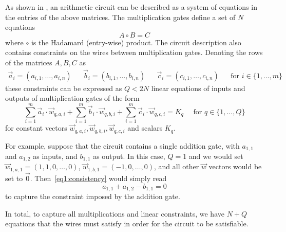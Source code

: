 As shown in \cite{BootleCCGP16}, an arithmetic circuit can be described as a system of equations in the entries of the above matrices. The multiplication gates define a set of $N$ equations 
\begin{equation}\label{eq1:product}
A \circ B = C
\end{equation}
where $\circ$ is the Hadamard (entry-wise) product. 
%
The circuit description also contains constraints on the wires between multiplication gates. %
Denoting the rows of the matrices $A,B,C$ as
\begin{align*}\vec{a}_ {i}=(a_{i,1},\ldots,a_{i,n})&& \vec{b}_ {i}=(b_{i,1},\ldots,b_{i,n})&&\vec{c}_ {i}=(c_{i,1},\ldots,c_{i,n})&& \text{for }  i \in \{1,\ldots,m\}\end{align*}
these constraints can be expressed as $Q<2N$ linear equations of inputs and outputs of multiplication gates of the form
\begin{equation}\label{eq1:consistency}
\sum_{i=1}^m \vec{a}_{i} \cdot \vec{w}_{q,{a,i}}+\sum_{i=1}^m \vec{b}_{i} \cdot \vec{w}_{q,{b,i}}+\sum_{i=1}^m \vec{c}_{i} \cdot  \vec{w}_{q,{c,i}}=K_{q} \quad \text{ for } q \in\{1,\ldots,Q\}
\end{equation}
for constant vectors $\vec{w}_{q,{a,i}},\vec{w}_{q,{b,i}},\vec{w}_{q,{c,i}}$ and scalars $K_{q}$.

For example, suppose that the circuit contains a single addition gate, with $a_{1,1}$ and $a_{1,2}$ as inputs, and $b_{1,1}$ as output. In this case, $Q=1$ and we would set $\vec{w}_{1,a,1} = (1,1,0,\ldots,0)$, $\vec{w}_{1,b,1} = (-1,0,\ldots,0)$, and all other $\vec{w}$ vectors would be set to $\vec{0}$. Then~\eqref{eq1:consistency} would simply read
$$ a_{1,1} + a_{1,2} - b_{1,1} = 0$$
to capture the constraint imposed by the addition gate.

In total, to capture all multiplications and linear constraints, we have $N+Q$ equations that the wires must satisfy in order for the circuit to be satisfiable. %

